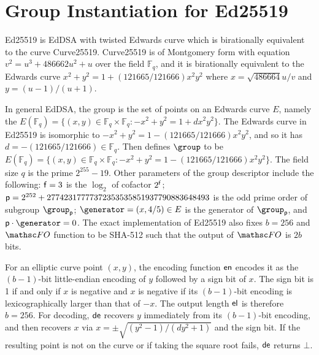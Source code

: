\section{Group Instantiation for Ed25519\label{sec-gp-instantiation}}
Ed25519 is EdDSA with twisted Edwards
curve which is birationally equivalent to the curve Curve25519. Curve25519 is of Montgomery form with equation $v^2 = u^3 + 486662u^2 + u$ over the field $\mathbb{F}_q$, and it is birationally equivalent to the Edwards curve $x^2 + y^2 = 1 + (121665/121666)x^2y^2$ where $x = \sqrt{486664}u/v$ and $y = (u - 1)/(u + 1)$. 

In general EdDSA, the group is the set of points on an Edwards curve $E$, namely the $E(\mathbb{F}_q) = \{(x, y) \in \mathbb{F}_q \times \mathbb{F}_q : -x^2 + y^2 = 1 + dx^2y^2\}$. The Edwards curve in Ed25519 is isomorphic to $-x^2 + y^2 = 1 - (121665/121666)x^2y^2$, and so it has $d = - (121665/121666) \in \mathbb{F}_q$. Then defines $\group$ to be $E(\mathbb{F}_q) = \{(x, y) \in \mathbb{F}_q \times \mathbb{F}_q : -x^2 + y^2 = 1 - (121665/121666)x^2y^2\}$. The field size $q$ is the prime $2^{255} - 19$. Other parameters of the group descriptor include the following: $\mathsf{f} = 3$ is the $\log_2$ of cofactor $2^{\mathsf{f}}$; $\mathsf{p} = 2^{252} + 27742317777372353535851937790883648493$ is the odd prime order of subgroup $\group_{\Prime}$; $\generator = (x, 4/5) \in E$ is the generator of $\group_{\Prime}$, and $\Prime \cdot \generator = 0$. The exact implementation of Ed25519 also fixes $b = 256$ and $\HASH$ function to be SHA-512 such that the output of $\HASH$ is $2b$ bits. 

For an elliptic curve point $(x, y)$, the encoding function $\mathsf{en}$ encodes it as the $(b-1)$-bit little-endian encoding of $y$ followed by a sign bit of $x$. The sign bit is 1 if and only if $x$ is negative and $x$ is negative if its $(b-1)$-bit encoding is lexicographically larger than that of $-x$. The output length $\mathsf{el}$ is therefore $b = 256$. For decoding, $\mathsf{de}$ recovers $y$ immediately from its $(b-1)$-bit encoding, and then recovers $x$ via $x = \pm \sqrt{(y^2 - 1)/(dy^2 + 1)}$ and the sign bit. If the resulting point is not on the curve or if taking the square root fails, $\mathsf{de}$ returns $\bot$.